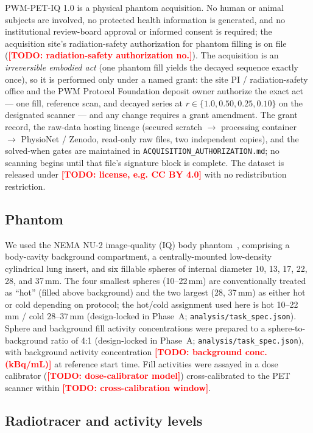 \documentclass[twoside,11pt]{article}
\newcommand{\todo}[1]{\textcolor{red}{\textbf{[TODO: #1]}}}
\begin{document}
PWM-PET-IQ 1.0 is a physical phantom acquisition. No human or animal subjects are
involved, no protected health information is generated, and no institutional
review-board approval or informed consent is required; the acquisition site's
radiation-safety authorization for phantom filling is on file
(\todo{radiation-safety authorization no.}). The acquisition is an
\emph{irreversible embodied act} (one phantom fill yields the decayed sequence
exactly once), so it is performed only under a named grant: the site PI /
radiation-safety office and the PWM Protocol Foundation deposit owner authorize
the exact act --- one fill, reference scan, and decayed series at
$r \in \{1.0, 0.50, 0.25, 0.10\}$ on the designated scanner --- and any change
requires a grant amendment. The grant record, the raw-data hosting lineage
(secured scratch $\rightarrow$ processing container $\rightarrow$ PhysioNet /
Zenodo, read-only raw files, two independent copies), and the solved-when gates
are maintained in \texttt{ACQUISITION\_AUTHORIZATION.md}; no scanning begins
until that file's signature block is complete. The dataset is released under
\todo{license, e.g. CC BY 4.0} with no redistribution restriction.

\subsection*{Phantom}

We used the NEMA NU-2 image-quality (IQ) body phantom~\citep{nema_nu2}, comprising
a body-cavity background compartment, a centrally-mounted low-density cylindrical
lung insert, and six fillable spheres of internal diameter 10, 13, 17, 22, 28, and
37\,mm. The four smallest spheres (10--22\,mm) are conventionally treated as
``hot'' (filled above background) and the two largest (28, 37\,mm) as either hot or
cold depending on protocol; the hot/cold assignment used here is
hot 10--22\,mm / cold 28--37\,mm (design-locked in Phase~A;
\texttt{analysis/task\_spec.json}). Sphere and background fill activity
concentrations were prepared to a sphere-to-background ratio of 4:1
(design-locked in Phase~A; \texttt{analysis/task\_spec.json}),
with background activity concentration \todo{background conc. (kBq/mL)} at reference
start time. Fill activities were assayed in a dose calibrator
(\todo{dose-calibrator model}) cross-calibrated to the PET scanner within
\todo{cross-calibration window}.

\subsection*{Radiotracer and activity levels}
\end{document}
